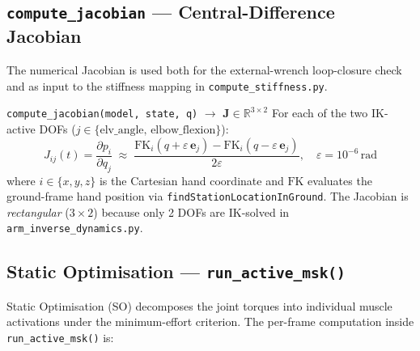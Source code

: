 \documentclass[11pt,a4paper]{article}
\newcommand{\file}[1]{\texttt{\color{PipePurple}#1}}
\newcommand{\R}{\mathbb{R}}
\begin{document}
\subsection{\texttt{compute\_jacobian} — Central-Difference Jacobian}

The numerical Jacobian is used both for the external-wrench loop-closure check
and as input to the stiffness mapping in \file{compute\_stiffness.py}.

\begin{eqbox}{\texttt{compute\_jacobian(model, state, q)} $\to$ $\bm{J}\in\R^{3\times2}$}
For each of the two IK-active DOFs ($j \in \{\text{elv\_angle},\,\text{elbow\_flexion}\}$):
\begin{equation}
J_{ij}(t) = \frac{\partial p_i}{\partial q_j}
  \;\approx\; \frac{\mathrm{FK}_i(q + \varepsilon\,\bm{e}_j)
                  - \mathrm{FK}_i(q - \varepsilon\,\bm{e}_j)}{2\varepsilon},
\quad \varepsilon = 10^{-6}\,\text{rad}
\end{equation}
where $i \in \{x,y,z\}$ is the Cartesian hand coordinate and
$\mathrm{FK}$ evaluates the ground-frame hand position
via \texttt{findStationLocationInGround}.
The Jacobian is \emph{rectangular} ($3\times2$) because only 2 DOFs are IK-solved
in \file{arm\_inverse\_dynamics.py}.
\end{eqbox}

\subsection{Static Optimisation — \texttt{run\_active\_msk()}}

Static Optimisation (SO) decomposes the joint torques into individual muscle
activations under the minimum-effort criterion.  The per-frame computation
inside \texttt{run\_active\_msk()} is:
\end{document}
